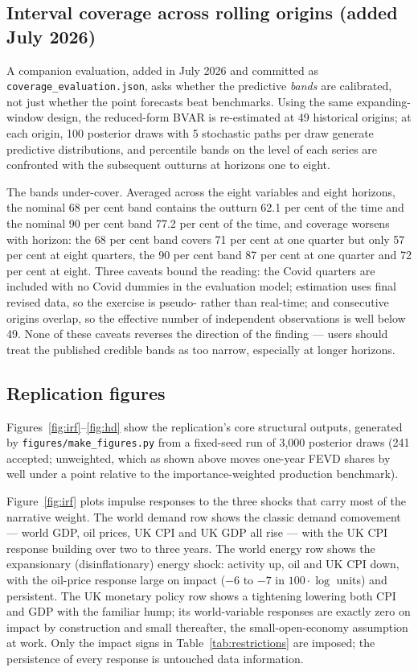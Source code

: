 \subsection{Interval coverage across rolling origins (added July 2026)}
\label{sec:coverage}

A companion evaluation, added in July 2026 and committed as
\texttt{coverage\_evaluation.json}, asks whether the predictive \emph{bands}
are calibrated, not just whether the point forecasts beat benchmarks. Using
the same expanding-window design, the reduced-form BVAR is re-estimated at 49
historical origins; at each origin, 100 posterior draws with 5 stochastic
paths per draw generate predictive distributions, and percentile bands on the
level of each series are confronted with the subsequent outturns at horizons
one to eight.

The bands under-cover. Averaged across the eight variables and eight
horizons, the nominal 68 per cent band contains the outturn 62.1 per cent of
the time and the nominal 90 per cent band 77.2 per cent of the time, and
coverage worsens with horizon: the 68 per cent band covers 71 per cent at one
quarter but only 57 per cent at eight quarters, the 90 per cent band 87 per
cent at one quarter and 72 per cent at eight. Three caveats bound the
reading: the Covid quarters are included with no Covid dummies in the
evaluation model; estimation uses final revised data, so the exercise is
pseudo- rather than real-time; and consecutive origins overlap, so the
effective number of independent observations is well below 49. None of these
caveats reverses the direction of the finding --- users should treat the
published credible bands as too narrow, especially at longer horizons.

\subsection{Replication figures}
\label{sec:repl-figures}

Figures~\ref{fig:irf}--\ref{fig:hd} show the replication's core structural outputs, generated by \texttt{figures/make\_figures.py} from a fixed-seed run of 3{,}000 posterior draws (241 accepted; unweighted, which as shown above moves one-year FEVD shares by well under a point relative to the importance-weighted production benchmark).

Figure~\ref{fig:irf} plots impulse responses to the three shocks that carry most of the narrative weight. The world demand row shows the classic demand comovement --- world GDP, oil prices, UK CPI and UK GDP all rise --- with the UK CPI response building over two to three years. The world energy row shows the expansionary (disinflationary) energy shock: activity up, oil and UK CPI down, with the oil-price response large on impact ($-6$ to $-7$ in $100\cdot\log$ units) and persistent. The UK monetary policy row shows a tightening lowering both CPI and GDP with the familiar hump; its world-variable responses are exactly zero on impact by construction and small thereafter, the small-open-economy assumption at work. Only the impact signs in Table~\ref{tab:restrictions} are imposed; the persistence of every response is untouched data information.

